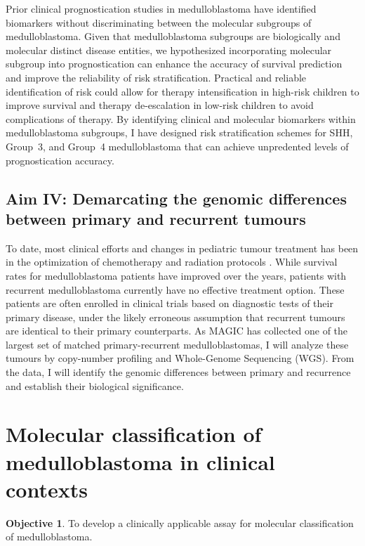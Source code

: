 \documentclass[11pt,letterpaper]{article}
\theoremstyle{definition}
\newtheorem*{objective}{Objective}
\begin{document}
Prior clinical prognostication studies in medulloblastoma have identified biomarkers without discriminating between the molecular subgroups of medulloblastoma. Given that medulloblastoma subgroups are biologically and molecular distinct disease entities, we hypothesized incorporating molecular subgroup into prognostication can enhance the accuracy of survival prediction and improve the reliability of risk stratification. Practical and reliable identification of risk could allow for therapy intensification in high-risk children to improve survival and therapy de-escalation in low-risk children to avoid complications of therapy. By identifying clinical and molecular biomarkers within medulloblastoma subgroups, I have designed risk stratification schemes for SHH, Group~3, and Group~4 medulloblastoma that can achieve unpredented levels of prognostication accuracy.

\subsection{Aim IV: Demarcating the genomic differences between primary and recurrent tumours}

To date, most clinical efforts and changes in pediatric tumour treatment has been in the optimization of chemotherapy and radiation protocols . While survival rates for medulloblastoma patients have improved over the years, patients with recurrent medulloblastoma currently have no effective treatment option. These patients are often enrolled in clinical trials based on diagnostic tests of their primary disease, under the likely erroneous assumption that recurrent tumours are identical to their primary counterparts. As MAGIC has collected one of the largest set of matched primary-recurrent medulloblastomas, I will analyze these tumours by copy-number profiling and Whole-Genome Sequencing (WGS). From the data, I will identify the genomic differences between primary and recurrence and establish their biological significance.

\clearpage


\section{Molecular classification of medulloblastoma in clinical contexts}

\begin{objective}
To develop a clinically applicable assay for molecular classification of medulloblastoma.
\end{objective}
\end{document}
